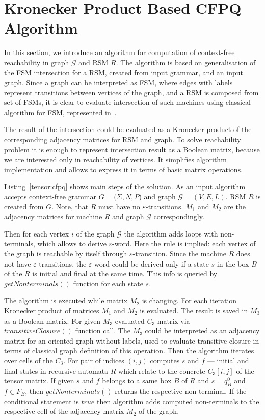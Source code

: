 \section{Kronecker Product Based CFPQ Algorithm}

In this section, we introduce an algorithm for computation of context-free reachability in graph $\mathcal{G}$ and RSM $R$. The algorithm is based on generalisation of the FSM intersection for a RSM, created from input grammar, and an input graph. Since a graph can be interpreted as FSM, where edges with labels represent transitions between vertices of the graph, and a RSM is composed from set of FSMs, it is clear to evaluate intersection of such machines using classical algorithm for FSM, represented in~\cite{automata:theory:10.5555/1177300}. 

The result of the intersection could be evaluated as a Kronecker product of the corresponding adjacency matrices for RSM and graph. To solve reachability problem it is enough to represent intersection result as a Boolean matrix, because we are interested only in reachability of vertices. It simplifies algorithm implementation and allows to express it in terms of basic matrix operations. 

Listing~\ref{tensor:cfpq} shows main steps of the solution. As an input algorithm accepts context-free grammar $G=(\Sigma,N,P$) and graph $\mathcal{G}=(V,E,L)$. RSM $R$ is created from $G$. Note, that $R$ must have no $\varepsilon$-transitions. $M_1$ and $M_2$ are the adjacency matrices for machine $R$ and graph $\mathcal{G}$ correspondingly. 

Then for each vertex $i$ of the graph $\mathcal{G}$ the algorithm adds loops with non-terminals, which allows to derive $\varepsilon$-word. Here the rule is implied: each vertex of the graph is reachable by itself through $\varepsilon$-transition. Since the machine $R$ does not have $\varepsilon$-transitions, the $\varepsilon$-word could be derived only if a state $s$ in the box $B$ of the $R$ is initial and final at the same time. This info is queried by $getNonterminals()$ function for each state $s$. 

The algorithm is executed while matrix $M_2$ is changing. For each iteration Kronecker product of matrices $M_1$ and $M_2$ is evaluated. The result is saved in $M_3$ as a Boolean matrix. For given $M_3$ evaluated $C_3$ matrix via $transitiveClosure()$ function call. The $M_3$ could be interpreted as an adjacency matrix for an oriented graph without labels, used to evaluate transitive closure in terms of classical graph definition of this operation. Then the algorithm iterates over cells of the $C_3$. For pair of indices $(i,j)$ computes $s$ and $f$ --- initial and final states in recursive automata $R$ which relate to the concrete $C_3[i,j]$ of the tensor matrix. If given $s$ and $f$ belongs to a same box $B$ of $R$ and $s = q_B^0$ and $f \in F_B$, then $getNonterminals()$ returns the respective non-terminal. If the conditional statement is $true$ then algorithm adds computed non-terminals to the respective cell of the adjacency matrix $M_2$ of the graph.

